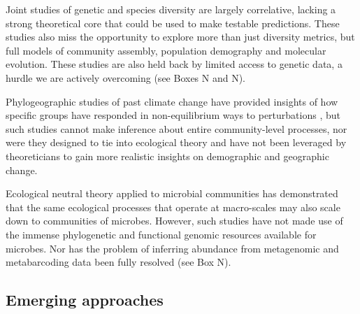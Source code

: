 \documentclass[12pt]{article}
\newcounter{Box}
\begin{document}
Joint studies of genetic and species diversity
\cite{Vanoverbeke2015-ym, Vellend2005-up, Vellend2014-ir,
  Papadopoulou2011-bd} are largely correlative, lacking a strong
theoretical core that could be used to make testable
predictions. These studies also miss the opportunity to explore more
than just diversity metrics, but full models of community assembly,
population demography and molecular evolution.  These studies are also
held back by limited access to genetic data, a hurdle we are actively
overcoming (see Boxes N and N).

Phylogeographic studies of past climate change have provided insights
of how specific groups have responded in non-equilibrium ways to
perturbations \cite{Arbogast2001-jx, Smith2012-db, Hickerson2005-ek,
  Satler2016-lb}, but such studies cannot make inference about entire
community-level processes, nor were they designed to tie into
ecological theory and have not been leveraged by theoreticians to gain
more realistic insights on demographic and geographic change.

Ecological neutral theory applied to microbial communities
\cite{Venkataraman2015-rk} has demonstrated that the same ecological
processes that operate at macro-scales may also scale down to
communities of microbes. However, such studies have not made use of
the immense phylogenetic and functional genomic resources available
for microbes. Nor has the problem of inferring abundance from
metagenomic and metabarcoding data been fully resolved (see Box N).

\subsection{Emerging approaches}
\end{document}
